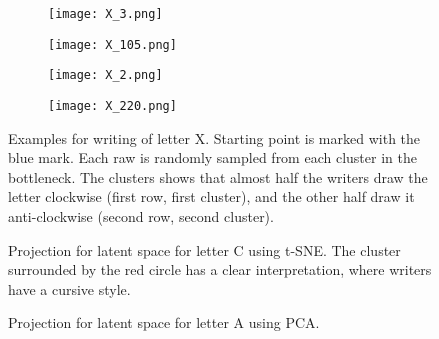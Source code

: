 \documentclass[conference]{IEEEtran}
\begin{document}
\begin{figure}[!htbp]
    \centering
    \begin{subfigure}{0.22\textwidth}
        \texttt{[image: X\_3.png]}
    \end{subfigure}
    \hspace{0.5em}
    \begin{subfigure}{0.22\textwidth}
        \texttt{[image: X\_105.png]}
    \end{subfigure}
    \vspace{1em}
    \begin{subfigure}{0.22\textwidth}
        \texttt{[image: X\_2.png]}
    \end{subfigure}
    \hspace{0.5em}
    \begin{subfigure}{0.22\textwidth}
        \texttt{[image: X\_220.png]}
    \end{subfigure}
    
    \caption{Examples for writing of letter X. Starting point is marked with the blue mark. Each raw is randomly sampled from each cluster in the bottleneck. The clusters shows that almost half the writers draw the letter clockwise (first row, first cluster), and the other half draw it anti-clockwise (second row, second cluster).}
    \label{fig:examples_x}
\end{figure}

\begin{figure}[htbp!]
    \centering
    \caption{Projection for latent space for letter C using t-SNE. The cluster surrounded by the red circle has a clear interpretation, where writers have a cursive style.}
    \label{fig:c_letter}
\end{figure}


\begin{figure}[htbp!]
    \centering
    \caption{Projection for latent space for letter A using PCA.}
    \label{fig:a_bottleneck}
\end{figure}
\end{document}
